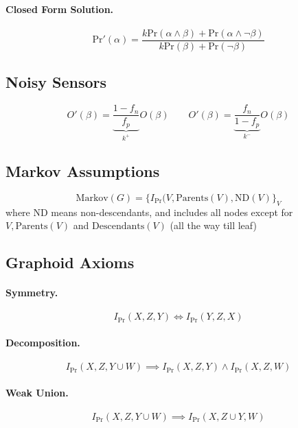 \documentclass[11pt]{article}
\newcommand{\pr}{\mathrm{Pr}}
\begin{document}
\paragraph{Closed Form Solution.}
\begin{equation}
	\pr' (\alpha) = \frac{k\pr ( \alpha \land \beta) + \pr (\alpha \land \neg \beta)}{k \pr ( \beta ) + \pr ( \neg \beta)}
\end{equation}

\subsection{Noisy Sensors}
\begin{equation}
	O'(\beta) = \underbrace{\frac{1 - f_n}{f_p}}_{k^+} O(\beta) \quad \quad O'(\beta) = \underbrace{\frac{f_n }{1 - f_p}}_{k^-} O(\beta)
\end{equation}

\subsection{Markov Assumptions}
\begin{equation}
	\mathrm{Markov}(G) = \{I_\pr ( V, \mathrm {Parents} (V), \mathrm{ND} (V) \}_V
\end{equation}
where $\mathrm{ND}$ means non-descendants, and includes all nodes except for $V, \mathrm {Parents} (V)$ and $\mathrm {Descendants}(V)$ (all the way till leaf)

\subsection{Graphoid Axioms\label{sec:graphoid}}
\paragraph{Symmetry.}
\begin{equation}
	I_\pr (X, Z, Y) \iff I _\pr (Y, Z, X) 
\end{equation}

\paragraph{Decomposition.}
\begin{equation}
	I_\pr (X, Z, Y \cup W) \implies I _\pr (X, Z, Y) \land I _\pr (X, Z, W)
\end{equation}

\paragraph{Weak Union.}
\begin{equation}
	I_\pr (X, Z, Y \cup W) \implies I_\pr (X, Z \cup Y, W) 
\end{equation}
\end{document}
